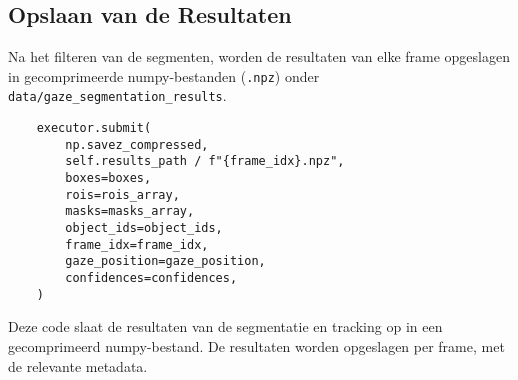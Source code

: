 \subsection{Opslaan van de Resultaten}

Na het filteren van de segmenten, worden de resultaten van elke frame opgeslagen in gecomprimeerde numpy-bestanden 
(\texttt{.npz}) onder \texttt{data/gaze\_segmentation\_results}.

\begin{listing}[H]
  \begin{verbatim}
    executor.submit(
        np.savez_compressed,
        self.results_path / f"{frame_idx}.npz",
        boxes=boxes,
        rois=rois_array,
        masks=masks_array,
        object_ids=object_ids,
        frame_idx=frame_idx,
        gaze_position=gaze_position,
        confidences=confidences,
    )
    \end{verbatim}
  \caption[Opslaan van segmentatie-resultaten]{
    \label{listing:opslaan-segmentatie-resultaten}
    Deze code slaat de resultaten van de segmentatie en tracking op in een gecomprimeerd numpy-bestand.
    De resultaten worden opgeslagen per frame, met de relevante metadata.
  }
\end{listing}

